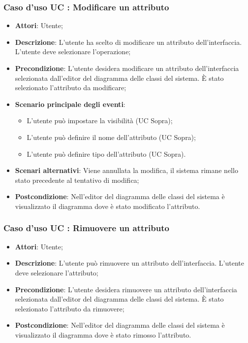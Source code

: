 \documentclass[../AnalisiDeiRequisiti.tex]{subfiles}
\begin{document}
		\subsubsection{Caso d'uso UC : Modificare un attributo}
			\begin{itemize}
				\item \textbf{Attori}: Utente;
				\item \textbf{Descrizione}: L'utente ha scelto di modificare un attributo
				dell'interfaccia. L'utente deve selezionare l'operazione;
				\item \textbf{Precondizione}: L'utente desidera modificare un attributo
				dell'interfaccia selezionata dall'editor del diagramma delle classi del
				sistema. È stato selezionato l'attributo da modificare;
				\item \textbf{Scenario principale degli eventi}:
					\begin{itemize}
						\item L'utente può impostare la visibilità (UC Sopra);
						\item L'utente può definire il nome dell'attributo (UC Sopra);
						\item L'utente può definire tipo dell'attributo (UC Sopra).
					\end{itemize}
				\item \textbf{Scenari alternativi}: Viene annullata la modifica, il sistema
				rimane nello stato precedente al tentativo di modifica;
				\item \textbf{Postcondizione}: Nell'editor del diagramma delle classi del
				sistema è visualizzato il diagramma dove è stato modificato l'attributo.
			\end{itemize}
		\subsubsection{Caso d'uso UC : Rimuovere un attributo}
			\begin{itemize}
				\item \textbf{Attori}: Utente;
				\item \textbf{Descrizione}: L'utente può rimuovere un attributo
				dell'interfaccia. L'utente deve selezionare l'attributo;
				\item \textbf{Precondizione}: L'utente desidera rimuovere un attributo
				dell'interfaccia selezionata dall'editor del diagramma delle classi del
				sistema. È stato selezionato l'attributo da rimuovere;
				\item \textbf{Postcondizione}: Nell'editor del diagramma delle classi del
				sistema è visualizzato il diagramma dove è stato rimosso l'attributo.
			\end{itemize}
\end{document}
